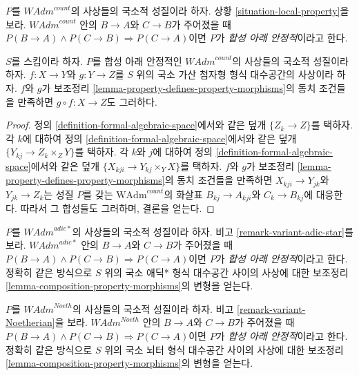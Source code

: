 \begin{situation}
\label{situation-composition-local-property}
$P$를 $\textit{WAdm}^{count}$의 사상들의 국소적 성질이라 하자.
상황 \ref{situation-local-property}을 보라.
$\textit{WAdm}^{count}$ 안의 $B \to A$와 $C \to B$가 주어졌을 때
$P(B \to A) \wedge P(C \to B) \Rightarrow P(C \to A)$이면
$P$가 {\it 합성 아래 안정적}이라고 한다.
\end{situation}

\begin{lemma}
\label{lemma-composition-property-morphisms}
$S$를 스킴이라 하자. $P$를 합성 아래 안정적인
$\textit{WAdm}^{count}$의 사상들의 국소적 성질이라 하자.
$f : X \to Y$와 $g : Y \to Z$를 $S$ 위의 국소 가산 첨자형 형식
대수공간의 사상이라 하자. $f$와 $g$가 보조정리 %
\ref{lemma-property-defines-property-morphisms}의 동치 조건들을
만족하면 $g \circ f : X \to Z$도 그러하다.
\end{lemma}

\begin{proof}
정의 \ref{definition-formal-algebraic-space}에서와 같은 덮개
$\{Z_k \to Z\}$를 택하자. 각 $k$에 대하여 정의
\ref{definition-formal-algebraic-space}에서와 같은 덮개
$\{Y_{kj} \to Z_k \times_Z Y\}$를 택하자. 각 $k$와 $j$에 대하여
정의 \ref{definition-formal-algebraic-space}에서와 같은 덮개
$\{X_{kji} \to Y_{kj} \times_Y X\}$를 택하자. $f$와 $g$가 %
보조정리 \ref{lemma-property-defines-property-morphisms}의 동치
조건들을 만족하면 $X_{kji} \to Y_{jk}$와 $Y_{jk} \to Z_k$는 %
성질 $P$를 갖는 $\text{WAdm}^{count}$의 화살표
$B_{kj} \to A_{kji}$와 $C_k \to B_{kj}$에 대응한다. 따라서 그
합성들도 그러하며, 결론을 얻는다.
\end{proof}

\begin{remark}[애딕* 변형]
\label{remark-composition-variant-adic-star}
$P$를 $\textit{WAdm}^{adic*}$의 사상들의 국소적 성질이라 하자.
비고 \ref{remark-variant-adic-star}를 보라.
$\textit{WAdm}^{adic*}$ 안의 $B \to A$와 $C \to B$가 주어졌을 때
$P(B \to A) \wedge P(C \to B) \Rightarrow P(C \to A)$이면
$P$가 {\it 합성 아래 안정적}이라고 한다. 정확히 같은 방식으로
$S$ 위의 국소 애딕* 형식 대수공간 사이의 사상에 대한 보조정리
\ref{lemma-composition-property-morphisms}의 변형을 얻는다.
\end{remark}

\begin{remark}[뇌터 변형]
\label{remark-composition-variant-Noetherian}
$P$를 $\textit{WAdm}^{Noeth}$의 사상들의 국소적 성질이라 하자.
비고 \ref{remark-variant-Noetherian}을 보라.
$\textit{WAdm}^{Noeth}$ 안의 $B \to A$와 $C \to B$가 주어졌을 때
$P(B \to A) \wedge P(C \to B) \Rightarrow P(C \to A)$이면
$P$가 {\it 합성 아래 안정적}이라고 한다. 정확히 같은 방식으로
$S$ 위의 국소 뇌터 형식 대수공간 사이의 사상에 대한 보조정리
\ref{lemma-composition-property-morphisms}의 변형을 얻는다.
\end{remark}

